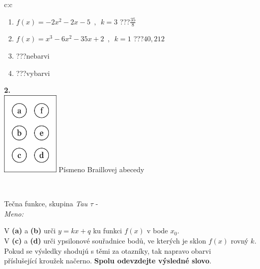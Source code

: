 \documentclass[10pt]{report}
\begin{document}
\begin{tabular}{c:c}
\begin{minipage}[c][104.5mm][t]{0.5\linewidth}
\begin{center}
\begin{minipage}{0.79\linewidth}
\begin{center}
\begin{varwidth}{\linewidth}
\begin{enumerate}
\item $f(x)=-2x^2-2x-5\enspace , \enspace k=3$\quad \dotfill\; ???\;\dotfill \quad $\frac{35}{8}$
\item $f(x)=x^3-6x^2-35x+2\enspace , \enspace k=1$\quad \dotfill\; ???\;\dotfill \quad $40 , 212$
\item \quad \dotfill\; ???\;\dotfill \quad nebarvi
\item \quad \dotfill\; ???\;\dotfill \quad vybarvi
\end{enumerate}
\end{varwidth}
\end{center}
\end{minipage}
\begin{minipage}{0.20\linewidth}
\begin{center}
{\Huge\bfseries 2.} \\[2mm]
\includegraphics[height=40mm]{../images/braille.png}
{\small Písmeno Braillovej abecedy}
\end{center}
\end{minipage}
\end{center}
\end{minipage}
\\ \hdashline
\begin{minipage}[c][104.5mm][t]{0.5\linewidth}
\begin{center}
\vspace{7mm}
{\huge Tečna funkce, skupina \textit{Tau $\tau$} -}\\[5mm]
\textit{Meno:}\phantom{xxxxxxxxxxxxxxxxxxxxxxxxxxxxxxxxxxxxxxxxxxxxxxxxxxxxxxxxxxxxxxxxx}\\[5mm]
\begin{minipage}{0.95\linewidth}
\begin{center}
V \textbf{(a)} a \textbf{(b)} urči  $y = kx + q$ ku funkci $f(x)$ v bode $x_0$.\\V \textbf{(c)} a \textbf{(d)} urči ypsilonové souřadnice bodů, ve kterých je sklon $f(x)$ rovný $k$.\\Pokud se výsledky shodujú s těmi za otazníky, tak napravo obarvi\\příslušející kroužek načerno. \textbf{Spolu odevzdejte výsledné slovo}.

\end{center}
\end{minipage}
\end{center}
\end{minipage}
\end{tabular}
\end{document}
